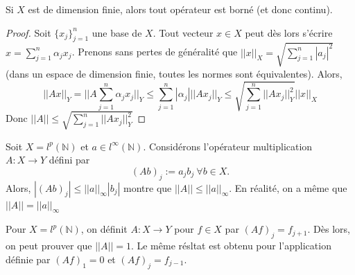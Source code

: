 \begin{theo}
    Si $X$ est de dimension finie, alors tout opérateur est borné (et donc continu).
\end{theo}

\begin{proof}
    Soit $\{x_j\}_{j=1}^n$ une base de $X$. Tout vecteur $x \in X$ peut dès lors s'écrire $x=\sum \limits_{j=1}^n \alpha_jx_j$. Prenons sans pertes de généralité que $||x||_X = \sqrt{\sum \limits_{j=1}^n |a_j|^2}$ (dans un espace de dimension finie, toutes les normes sont équivalentes). Alors,
    \begin{equation*}
        ||Ax||_Y = ||A\sum \limits_{j=1}^n \alpha_jx_j||_Y \leq \sum_{j=1}^n |\alpha_j|||Ax_j||_Y \leq \sqrt{ \sum_{j=1}^n ||Ax_j||_Y^2}||x||_X
    \end{equation*}
    Donc $||A|| \leq \sqrt{\sum \limits_{j=1}^n ||Ax_j||_Y^2}$
\end{proof}

\begin{example}
    Soit $X=l^p(\mathbb{N})$ et $a\in l^\infty(\mathbb{N})$. Considérons l'opérateur multiplication $A:X\rightarrow Y$ défini par
    \begin{equation*}
        (Ab)_j := a_jb_j \ \forall b \in X.
    \end{equation*}
    Alors, $|(Ab)_j| \leq ||a||_\infty |b_j|$ montre que $||A||\leq||a||_\infty$. En réalité, on a même que $||A||=||a||_\infty$
\end{example}

\begin{example}
    Pour $X=l^p(\mathbb{N})$, on définit $A:X\rightarrow Y$ pour $f \in X$ par $(Af)_j = f_{j+1}$. Dès lors, on peut prouver que $||A|| = 1$. Le même résltat est obtenu pour l'application définie par $(Af)_1 = 0$ et $(Af)_j = f_{j-1}$.
\end{example}

